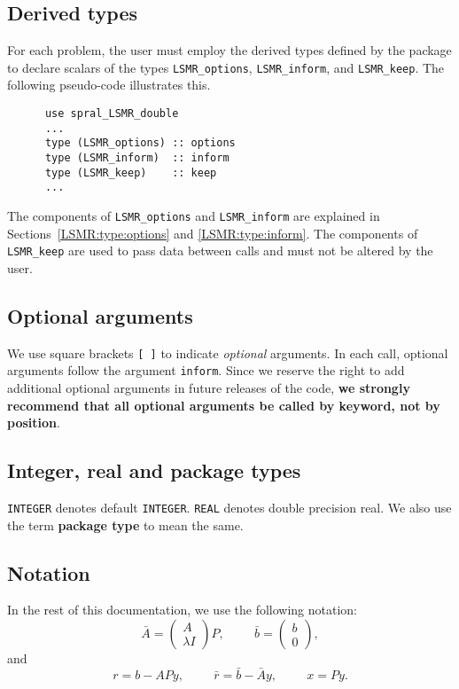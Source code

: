 \subsection{Derived types}

For each problem, the user must employ the derived types defined by the
package to declare scalars of the types
{\tt LSMR\_options}, {\tt LSMR\_inform}, and {\tt LSMR\_keep}.
The following pseudo-code illustrates this.
\begin{verbatim}
      use spral_LSMR_double
      ...
      type (LSMR_options) :: options
      type (LSMR_inform)  :: inform
      type (LSMR_keep)    :: keep
      ...
\end{verbatim}
The components of {\tt LSMR\_options} and {\tt LSMR\_inform} are explained
in Sections~\ref{LSMR:type:options} and \ref{LSMR:type:inform}.
The components of {\tt LSMR\_keep} are used to pass
data between calls and must not be altered by the user.


\subsection{Optional arguments}

We use square brackets {\tt [ ]} to indicate {\it optional} arguments.
In each
call, optional arguments follow the argument {\tt inform}.  Since we
reserve the right to add additional optional arguments in future
releases of the code, {\bf we strongly recommend that all optional
arguments be called by keyword, not by position}.

\subsection{Integer, real and package types}

{\tt INTEGER} denotes default {\tt INTEGER}.
{\tt REAL} denotes double precision real.
We also use the term {\bf package type} to mean the same.

\subsection{Notation}
In the rest of this documentation, we use the following notation:
    $$ \bar{A}   =  \left( \begin{array}{c} A \\ \lambda I \end{array} \right)P, 
  \hspace{1cm}     \bar{b}   =  \left( \begin{array}{c} b \\ 0 \end{array} \right), $$
    and
     $$r      =  b - APy , \hspace{1cm}        \bar{r}  =  \bar{b} - \bar{A}y,
    \hspace{1cm}  x = Py. $$

